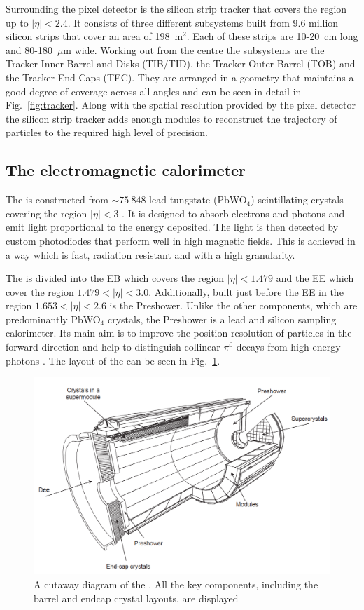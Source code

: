 Surrounding the pixel detector is the silicon strip tracker that
covers the region up to $|\eta|<2.4$. It consists of three different
subsystems built from 9.6 million silicon strips that cover an area of
198~m$^2$. Each of these strips are 10-20~cm long and 80-180~$\mu$m
wide. Working out from the centre the subsystems are the
Tracker Inner Barrel and Disks (TIB/TID), the Tracker Outer Barrel
(TOB) and the Tracker End Caps (TEC). They are arranged in a geometry
that maintains a good degree of coverage across all angles and can be
seen in detail in Fig.~\ref{fig:tracker}. Along with the spatial
resolution provided by the pixel detector the silicon strip tracker
adds enough modules to reconstruct the trajectory of particles to the
required high level of precision.

\subsection{The electromagnetic calorimeter} 

The \ECAL is constructed from $\sim 75~848$ lead tungstate (PbWO$_4$)
scintillating crystals covering the region $|\eta|<3$ \cite{CMS:1997ema}. It is
designed to absorb electrons and photons and emit light proportional to the
energy deposited. The light is then detected by custom photodiodes that
perform well in high magnetic fields. This is achieved in a way which
is fast, radiation resistant and with a high granularity. 

The \ECAL is divided into the \ac{EB} which covers the region
$|\eta|<1.479$ and the \ac{EE} which cover the region
$1.479<|\eta|<3.0$. Additionally, built just before the \ac{EE} in the
region $1.653<|\eta|<2.6$ is the Preshower. Unlike the other
components, which are predominantly PbWO$_4$ crystals, the Preshower is
a lead and silicon sampling calorimeter. Its main aim is to improve
the position resolution of particles in the forward direction and help
to distinguish collinear $\pi^0$ decays from high energy photons
\cite{Chatrchyan:2008aa}. The layout of the \ECAL can be seen in
Fig.~\ref{fig:ecal}.

\begin{figure}
\begin{center}
\includegraphics[width=0.8\linewidth]{figs/ecal_colorless} \end{center}
\caption{ A cutaway diagram of the \CMS \ECAL. All the key components,
including the barrel and endcap crystal layouts, are displayed
\cite{Chatrchyan:2008aa}}
\label{fig:ecal} \end{figure}


